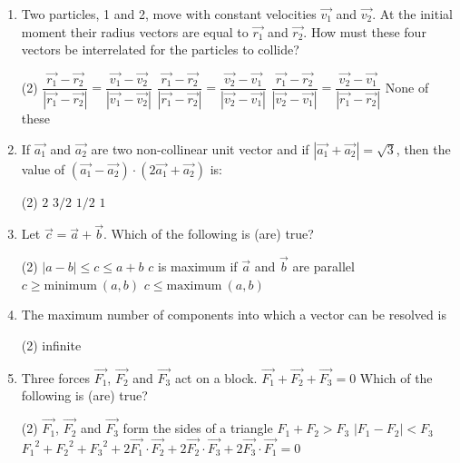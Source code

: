 \documentclass{article}
\newcommand{\itemstared}{\refstepcounter{enumi}\item[$^\star$\theenumi.]}
\renewcommand{\ans}{\quad}
\begin{document}
\begin{enumerate}
    \itemstared Two particles, 1 and 2, move with constant velocities $\vec{v_1}$ and $\vec{v_2}$. At the initial moment their radius vectors are equal to $\vec{r_1}$ and $\vec{r_2}$. How must these four vectors be interrelated for the particles to collide?
        \begin{tasks}(2)
            \task $\dfrac{\vec{r_1}-\vec{r_2}}{|\vec{r_1}-\vec{r_2}|}=\dfrac{\vec{v_1}-\vec{v_2}}{|\vec{v_1}-\vec{v_2}|}$
            \task $\dfrac{\vec{r_1}-\vec{r_2}}{|\vec{r_1}-\vec{r_2}|}=\dfrac{\vec{v_2}-\vec{v_1}}{|\vec{v_2}-\vec{v_1}|}$\ans
            \task $\dfrac{\vec{r_1}-\vec{r_2}}{|\vec{v_2}-\vec{v_1}|}=\dfrac{\vec{v_2}-\vec{v_1}}{|\vec{r_1}-\vec{r_2}|}$
            \task None of these
        \end{tasks}

    \item If $\vec{a_1}$ and $\vec{a_2}$ are two non-collinear unit vector and if $|\vec{a_1} + \vec{a_2}|=\sqrt{3}$, then the value of $(\vec{a_1}-\vec{a_2})\cdot(2\vec{a_1}+\vec{a_2})$ is:
        \begin{tasks}(2)
            \task $2$
            \task $3/2$
            \task $1/2$\ans
            \task $1$
        \end{tasks}

    \item Let $\vec{c} = \vec{a} + \vec{b}$. Which of the following is (are) true?
        \begin{tasks}(2)
            \task $|a-b| \leq c \leq a+b$\ans
            \task $c$ is maximum if $\vec{a}$ and $\vec{b}$ are parallel \ans
            \task $c \geq \text{minimum} ~(a, b)$
            \task $c \leq \text{maximum}~ (a, b)$
        \end{tasks}

    \item The maximum number of components into which a vector can be resolved is
        \begin{tasks}(2)
            \task infinite \ans
        \end{tasks}

    \item Three forces $\vec{F_1}$, $\vec{F_2}$ and $\vec{F_3}$ act on a block. $\vec{F_1} + \vec{F_2} + \vec{F_3} = 0$ Which of the following is (are) true?
        \begin{tasks}(2)
            \task $\vec{F_1}$, $\vec{F_2}$ and $\vec{F_3}$ form the sides of a triangle \ans
            \task $F_1 + F_2 > F_3$\ans
            \task $|F_1 - F_2| < F_3$\ans
            \task ${F_1}^2 + {F_2}^2 + {F_3}^2 + 2 \vec{F_1} \cdot \vec{F_2} + 2\vec{F_2} \cdot \vec{F_3} + 2 \vec{F_3} \cdot \vec{F_1}=0$\ans
        \end{tasks}

\end{enumerate}


\pagebreak


\end{document}
